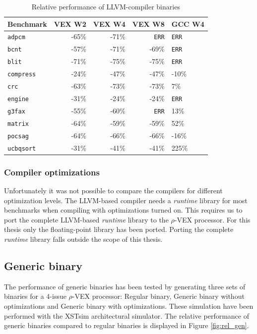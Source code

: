 \begin{table}
  \centering
    \begin{tabular}{|l|r|r|r|l|}
    \hline
    \textbf{Benchmark} & \multicolumn{1}{|r|}{\textbf{VEX W2}} & \multicolumn{1}{|r|}{\textbf{VEX W4}}  & \multicolumn{1}{|r|}{\textbf{VEX W8}} & \textbf{GCC W4} \\ \hline
	\texttt{adpcm} 		&  -65\% &  -71\% & \texttt{ERR} & \texttt{ERR}	\\ \hline
	\texttt{bcnt} 		&  -57\% &  -71\% & -69\% & \texttt{ERR}	\\ \hline
	\texttt{blit} 		&  -71\% &  -75\% & -75\% & \texttt{ERR}	\\ \hline
	\texttt{compress} 	&  -24\% &  -47\% & -47\% & -10\%	\\ \hline
	\texttt{crc} 		&  -63\% &  -73\% & -73\% & 7\%	\\ \hline
	\texttt{engine} 	&  -31\% &  -24\% & -24\% & \texttt{ERR}	\\ \hline
	\texttt{g3fax} 		&  -55\% &  -60\% & \texttt{ERR} & 13\%	\\ \hline
	\texttt{matrix} 	&  -64\% &  -59\% & -59\% & 52\%	\\ \hline
	\texttt{pocsag} 	&  -64\% &  -66\% & -66\% & -16\%	\\ \hline
	\texttt{ucbqsort} 	&  -31\% &  -41\% & -41\% & 225\%	\\ \hline
    \end{tabular}
  \caption{Relative performance of LLVM-compiler binaries}
  \label{tbl:rel_perf}
\end{table}

\subsubsection{Compiler optimizations}
Unfortunately it was not possible to compare the compilers for different optimization levels. The LLVM-based compiler needs a \emph{runtime} library for most benchmarks when compiling with optimizations turned on. This requires us to port the complete LLVM-based \emph{runtime} library to the $\rho$-VEX processor. For this thesis only the floating-point library has been ported. Porting the complete \emph{runtime} library falls outside the scope of this thesis.

\subsection{Generic binary}
The performance of generic binaries has been tested by generating three sets of binaries for a 4-issue $\rho$-VEX processor: Regular binary, Generic binary without optimizations and Generic binary with optimizations. These simulation have been performed with the XSTsim architectural simulator. The relative performance of generic binaries compared to regular binaries is displayed in Figure \ref{fig:rel_gen}.

